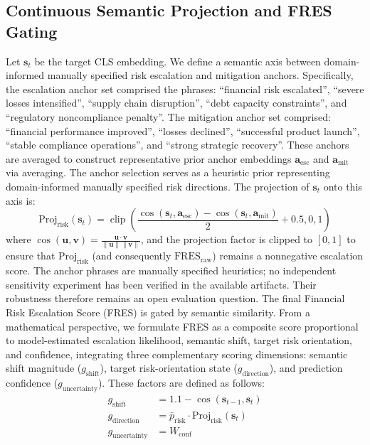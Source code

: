 \documentclass[pdflatex,sn-basic,Numbered]{sn-jnl}
\begin{document}
\subsection{Continuous Semantic Projection and FRES Gating}
Let $\mathbf{s}_t$ be the target CLS embedding. We define a semantic axis between domain-informed manually specified risk escalation and mitigation anchors. Specifically, the escalation anchor set comprised the phrases: ``financial risk escalated'', ``severe losses intensified'', ``supply chain disruption'', ``debt capacity constraints'', and ``regulatory noncompliance penalty''. The mitigation anchor set comprised: ``financial performance improved'', ``losses declined'', ``successful product launch'', ``stable compliance operations'', and ``strong strategic recovery''. These anchors are averaged to construct representative prior anchor embeddings $\mathbf{a}_{\text{esc}}$ and $\mathbf{a}_{\text{mit}}$ via averaging. The anchor selection serves as a heuristic prior representing domain-informed manually specified risk directions. The projection of $\mathbf{s}_t$ onto this axis is:
\begin{equation}
\label{eq:proj_risk}
\text{Proj}_{\text{risk}}(\mathbf{s}_t) = \operatorname{clip}\left(\frac{\cos(\mathbf{s}_t, \mathbf{a}_{\text{esc}}) - \cos(\mathbf{s}_t, \mathbf{a}_{\text{mit}})}{2} + 0.5, 0, 1\right)
\end{equation}
where $\cos(\mathbf{u}, \mathbf{v}) = \frac{\mathbf{u}\cdot\mathbf{v}}{\|\mathbf{u}\|\|\mathbf{v}\|}$, and the projection factor is clipped to $[0, 1]$ to ensure that $\text{Proj}_{\text{risk}}$ (and consequently $\text{FRES}_{\text{raw}}$) remains a nonnegative escalation score. The anchor phrases are manually specified heuristics; no independent sensitivity experiment has been verified in the available artifacts. Their robustness therefore remains an open evaluation question. The final Financial Risk Escalation Score (FRES) is gated by semantic similarity. From a mathematical perspective, we formulate FRES as a composite score proportional to model-estimated escalation likelihood, semantic shift, target risk orientation, and confidence, integrating three complementary scoring dimensions: semantic shift magnitude ($g_{\text{shift}}$), target risk-orientation state ($g_{\text{direction}}$), and prediction confidence ($g_{\text{uncertainty}}$). These factors are defined as follows:
\begin{align}
g_{\text{shift}} &= 1.1 - \cos(\mathbf{s}_{t-1}, \mathbf{s}_t) \\
g_{\text{direction}} &= \bar{p}_{\text{risk}} \cdot \text{Proj}_{\text{risk}}(\mathbf{s}_t) \\
g_{\text{uncertainty}} &= W_{\text{conf}}
\end{align}
\end{document}
